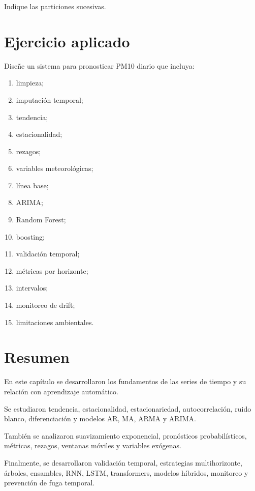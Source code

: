 \documentclass[
  spanish,
  10.5pt,
  letterpaper,
  DIV=11,
  numbers=noendperiod,
  oneside,
  open=any]{scrreprt}
\providecommand{\tightlist}{%
  \setlength{\itemsep}{0pt}\setlength{\parskip}{0pt}}
\theoremstyle{definition}
\theoremstyle{definition}
\theoremstyle{plain}
\theoremstyle{remark}
\begin{document}
Indique las particiones sucesivas.

\section*{Ejercicio aplicado}\label{ejercicio-aplicado-17}


Diseñe un sistema para pronosticar PM10 diario que incluya:

\begin{enumerate}
\def\labelenumi{\arabic{enumi}.}
\tightlist
\item
  limpieza;
\item
  imputación temporal;
\item
  tendencia;
\item
  estacionalidad;
\item
  rezagos;
\item
  variables meteorológicas;
\item
  línea base;
\item
  ARIMA;
\item
  Random Forest;
\item
  boosting;
\item
  validación temporal;
\item
  métricas por horizonte;
\item
  intervalos;
\item
  monitoreo de drift;
\item
  limitaciones ambientales.
\end{enumerate}

\section*{Resumen}\label{resumen-20}


En este capítulo se desarrollaron los fundamentos de las series de
tiempo y su relación con aprendizaje automático.

Se estudiaron tendencia, estacionalidad, estacionariedad,
autocorrelación, ruido blanco, diferenciación y modelos AR, MA, ARMA y
ARIMA.

También se analizaron suavizamiento exponencial, pronósticos
probabilísticos, métricas, rezagos, ventanas móviles y variables
exógenas.

Finalmente, se desarrollaron validación temporal, estrategias
multihorizonte, árboles, ensambles, RNN, LSTM, transformers, modelos
híbridos, monitoreo y prevención de fuga temporal.
\end{document}
